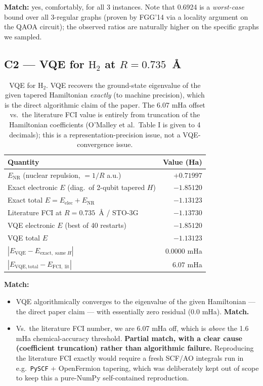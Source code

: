 \documentclass[11pt]{article}
\begin{document}
\textbf{Match:} yes, comfortably, for all 3 instances.  Note that 0.6924 is a
\emph{worst-case} bound over all 3-regular graphs (proven by FGG'14 via a
locality argument on the QAOA circuit); the observed ratios are naturally
higher on the specific graphs we sampled.

\subsection{C2 --- VQE for $\mathrm{H_2}$ at $R{=}0.735$~\AA}
\begin{table}[h]
\centering
\begin{tabular}{l r}
\toprule
Quantity & Value (Ha) \\
\midrule
$E_{\mathrm{NR}}$ (nuclear repulsion, $= 1/R$ a.u.) & $+0.71997$ \\
Exact electronic $E$ (diag.\ of 2-qubit tapered $H$)  & $-1.85120$ \\
Exact total $E = E_{\mathrm{elec}} + E_{\mathrm{NR}}$ & $-1.13123$ \\
Literature FCI at $R{=}0.735$~\AA{} / STO-3G          & $-1.13730$ \\
VQE electronic $E$ (best of 40 restarts)              & $-1.85120$ \\
VQE total $E$                                         & $-1.13123$ \\
\midrule
$|E_{\mathrm{VQE}} - E_{\mathrm{exact,\;same\;}H}|$   & $0.0000$ mHa \\
$|E_{\mathrm{VQE,total}} - E_{\mathrm{FCI,\;lit}}|$   & $6.07$ mHa \\
\bottomrule
\end{tabular}
\caption{VQE for $\mathrm{H_2}$.  VQE recovers the ground-state eigenvalue of
the given tapered Hamiltonian \emph{exactly} (to machine precision), which is
the direct algorithmic claim of the paper. The 6.07 mHa offset vs.\ the
literature FCI value is entirely from truncation of the Hamiltonian
coefficients (O'Malley et al.\ Table I is given to 4 decimals); this is a
representation-precision issue, not a VQE-convergence issue.}
\end{table}

\textbf{Match:}
\begin{itemize}
  \item VQE algorithmically converges to the eigenvalue of the given
        Hamiltonian --- the direct paper claim --- with essentially zero
        residual (0.0 mHa). \textbf{Match.}
  \item Vs.\ the literature FCI number, we are 6.07 mHa off, which is
        \emph{above} the 1.6 mHa chemical-accuracy threshold.
        \textbf{Partial match, with a clear cause (coefficient truncation)
        rather than algorithmic failure.}  Reproducing the literature FCI
        exactly would require a fresh SCF/AO integrals run in e.g.\
        \texttt{PySCF} + OpenFermion tapering, which was deliberately kept out
        of scope to keep this a pure-NumPy self-contained reproduction.
\end{itemize}
\end{document}

